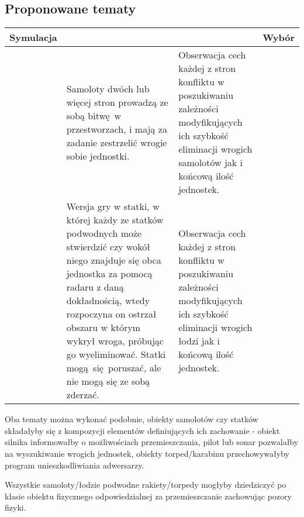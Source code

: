 \documentclass{article}
\begin{document}
\subsection{Proponowane tematy}
\begin{adjustbox}{center}
	\begin{tabular}[p]{
			>{\centering\arraybackslash}c
			p{}
			p{}
			>{\centering\arraybackslash}c
		}
			Symulacja & \centering{Opis} & \centering{Cel} & Wybór \\
			\hline \centering{Bitwa samolotowa} & { 
				Samoloty dwóch lub więcej stron prowadzą ze sobą
				bitwę w przestworzach, i mają za zadanie zestrzelić
				wrogie sobie jednostki.
			} & { 
				Obserwacja cech każdej z stron konfliktu w poszukiwaniu
				zależności modyfikujących ich szybkość eliminacji wrogich
				samolotów jak i końcową ilość jednostek.
			}& \checkmark \\
			\hline \centering{Statki} & { 
				Wersja gry w statki, w której każdy ze statków podwodnych może stwierdzić
				czy wokół niego znajduje się obca jednostka za pomocą radaru z daną dokładnością,
				wtedy rozpoczyna on ostrzał obszaru w którym wykrył wroga,
				próbując go wyeliminować. Statki mogą się poruszać, ale nie mogą się
				ze sobą zderzać.
			} & { 
				Obserwacja cech każdej z stron konfliktu w poszukiwaniu
				zależności modyfikujących ich szybkość eliminacji wrogich
				łodzi jak i końcową ilość jednostek.
			}&  \\
		\end{tabular}
\end{adjustbox}

Oba tematy można wykonać podobnie, obiekty samolotów czy statków składałyby się z kompozycji
elementów definiujących ich zachowanie - obiekt silnika informowałby o możliwościach
przemieszczania, pilot lub sonar pozwalałby na wyszukiwanie wrogich jednostek, obiekty
torped/karabinu przechowywałyby program unieszkodliwiania adwersarzy.

Wszystkie samoloty/łodzie podwodne rakiety/torpedy mogłyby dziedziczyć po klasie obiektu fizycznego
odpowiedzialnej za przemieszczanie zachowując pozory fizyki.
\end{document}
